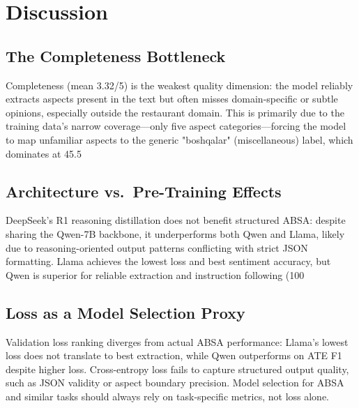 \documentclass[runningheads]{llncs}
\begin{document}
\section{Discussion}
\label{sec:discussion}

\subsection{The Completeness Bottleneck}
\label{sec:disc_completeness}
Completeness (mean 3.32/5) is the weakest quality dimension: the model reliably extracts aspects present in the text but often misses domain-specific or subtle opinions, especially outside the restaurant domain. This is primarily due to the training data's narrow coverage—only five aspect categories—forcing the model to map unfamiliar aspects to the generic "boshqalar" (miscellaneous) label, which dominates at 45.5%

\subsection{Architecture vs.\ Pre-Training Effects}
\label{sec:disc_arch_pretraining}
DeepSeek's R1 reasoning distillation does not benefit structured ABSA: despite sharing the Qwen-7B backbone, it underperforms both Qwen and Llama, likely due to reasoning-oriented output patterns conflicting with strict JSON formatting. Llama achieves the lowest loss and best sentiment accuracy, but Qwen is superior for reliable extraction and instruction following (100%

\subsection{Loss as a Model Selection Proxy}
\label{sec:disc_loss_proxy}
Validation loss ranking diverges from actual ABSA performance: Llama's lowest loss does not translate to best extraction, while Qwen outperforms on ATE F1 despite higher loss. Cross-entropy loss fails to capture structured output quality, such as JSON validity or aspect boundary precision. Model selection for ABSA and similar tasks should always rely on task-specific metrics, not loss alone.
\end{document}
